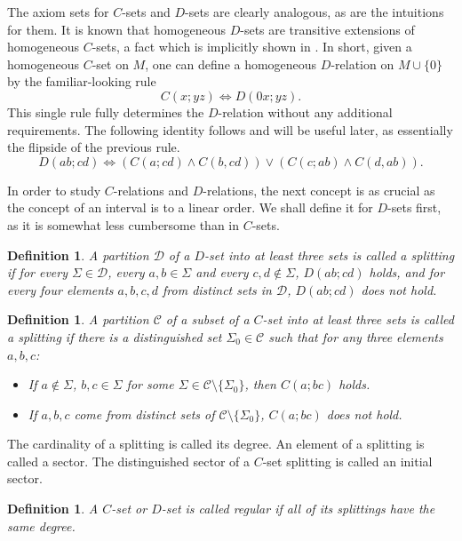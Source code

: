 \documentclass{amsart}
\newtheorem{definition}[theorem]{Definition}
\newcommand{\set}[1]{\{#1 \}}
\begin{document}
The axiom sets for $C$-sets and $D$-sets are clearly analogous, as are the intuitions for them. It is known that homogeneous $D$-sets are transitive extensions of homogeneous $C$-sets, a fact which is implicitly shown in \cite[Theorem 22.1]{adeleke1998relations}. In short, given a homogeneous $C$-set on $M$, one can define a homogeneous $D$-relation on $M \cup \set{0}$ by the familiar-looking rule
$$C(x; yz) \Longleftrightarrow D(0x;yz).$$
This single rule fully determines the $D$-relation without any additional requirements. The following identity follows \cite[Theorem 23.5]{adeleke1998relations} and will be useful later, as essentially the flipside of the previous rule.
$$D(ab;cd) \iff (C(a;cd) \wedge C(b,cd)) \vee (C(c; ab) \wedge C(d, ab)).$$

In order to study $C$-relations and $D$-relations, the next concept is as crucial as the concept of an interval is to a linear order. We shall define it for $D$-sets first, as it is somewhat less cumbersome than in $C$-sets.
    

\begin{definition}
    A partition $\mathcal{D}$ of a $D$-set into at least three sets is called a splitting if for every $\Sigma \in \mathcal{D}$, every $a,b \in \Sigma$ and every $c, d \not \in \Sigma$, $D(ab;cd)$ holds, and for every four elements $a,b,c,d$ from distinct sets in $\mathcal{D}$, $D(ab;cd)$ does not hold.
\end{definition}
\begin{definition}
    A partition $\mathcal{C}$ of a subset of a $C$-set into at least three sets is called a splitting if there is a distinguished set $\Sigma_0 \in \mathcal{C}$ such that for any three elements $a,b,c$:
    \begin{itemize}
        \item If $a \not\in \Sigma$, $b,c  \in \Sigma$ for some $\Sigma \in \mathcal{C}\setminus\set{\Sigma_0}$, then $C(a;bc)$ holds.
        \item If $a,b,c$ come from distinct sets of $\mathcal{C}\setminus\set{\Sigma_0}$, $C(a;bc)$ does not hold.
    \end{itemize}
\end{definition}


The cardinality of a splitting is called its degree. An element of a splitting is called a sector. The distinguished sector of a $C$-set splitting is called an initial sector. 

\begin{definition}
    A $C$-set or $D$-set is called \emph{regular} if all of its splittings have the same degree.
\end{definition}
\end{document}
